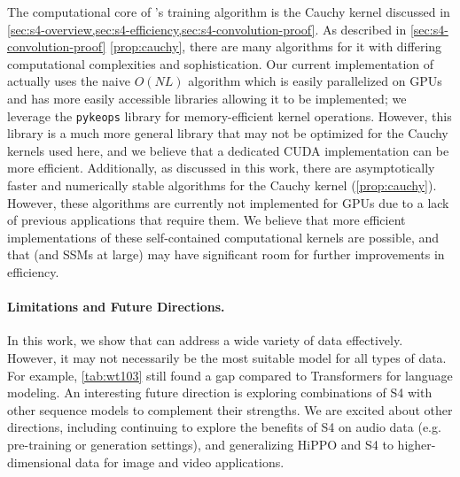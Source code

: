 The computational core of \methodabbrv's training algorithm is the Cauchy kernel discussed in \cref{sec:s4-overview,sec:s4-efficiency,sec:s4-convolution-proof}.
As described in \cref{sec:s4-convolution-proof} \cref{prop:cauchy},
there are many algorithms for it with differing computational complexities and sophistication.
Our current implementation of \methodabbrv{} actually uses the naive \( O(NL) \) algorithm
which is easily parallelized on GPUs and has more easily accessible libraries allowing it to be implemented;
we leverage the \texttt{pykeops} library for memory-efficient kernel operations.
However, this library is a much more general library that may not be optimized for the Cauchy kernels used here,
and we believe that a dedicated CUDA implementation can be more efficient.
Additionally, as discussed in this work, there are asymptotically faster and numerically stable algorithms for the Cauchy kernel (\cref{prop:cauchy}).
However, these algorithms are currently not implemented for GPUs due to a lack of previous applications that require them.
We believe that more efficient implementations of these self-contained computational kernels are possible,
and that \methodabbrv{} (and SSMs at large) may have significant room for further improvements in efficiency.


\paragraph{Limitations and Future Directions.}
In this work, we show that \methodabbrv{} can address a wide variety of data effectively.
However, it may not necessarily be the most suitable model for all types of data.
For example, \cref{tab:wt103} still found a gap compared to Transformers for language modeling.
An interesting future direction is exploring combinations of S4 with other sequence models to complement their strengths.
We are excited about other directions, including continuing to explore the benefits of S4 on audio data (e.g. pre-training or generation settings),
and generalizing HiPPO and S4 to higher-dimensional data for image and video applications.
